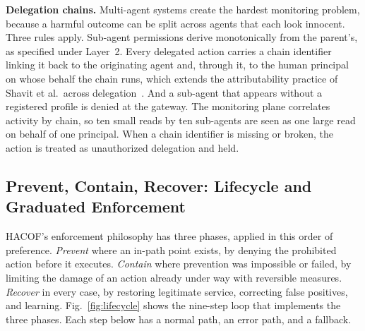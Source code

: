 \documentclass{ieeeaccess}
\newcommand{\hacof}{HACOF}
\begin{document}
\textbf{Delegation chains.} Multi-agent systems create the hardest monitoring problem, because a harmful outcome can be split across agents that each look innocent. Three rules apply. Sub-agent permissions derive monotonically from the parent's, as specified under Layer~2. Every delegated action carries a chain identifier linking it back to the originating agent and, through it, to the human principal on whose behalf the chain runs, which extends the attributability practice of Shavit et al.\ across delegation~\cite{shavit2023agentic}.
And a sub-agent that appears without a registered profile is denied at the gateway. The monitoring plane correlates activity by chain, so ten small reads by ten sub-agents are seen as one large read on behalf of one principal. When a chain identifier is missing or broken, the action is treated as unauthorized delegation and held.

\subsection{Prevent, Contain, Recover: Lifecycle and Graduated Enforcement}
\label{sec:hacof-lifecycle}

\hacof's enforcement philosophy has three phases, applied in this order of preference. \textit{Prevent} where an in-path point exists, by denying the prohibited action before it executes. \textit{Contain} where prevention was impossible or failed, by limiting the damage of an action already under way with reversible measures. \textit{Recover} in every case, by restoring legitimate service, correcting false positives, and learning. Fig.~\ref{fig:lifecycle} shows the nine-step loop that implements the three phases. Each step below has a normal path, an error path, and a fallback.
\end{document}
